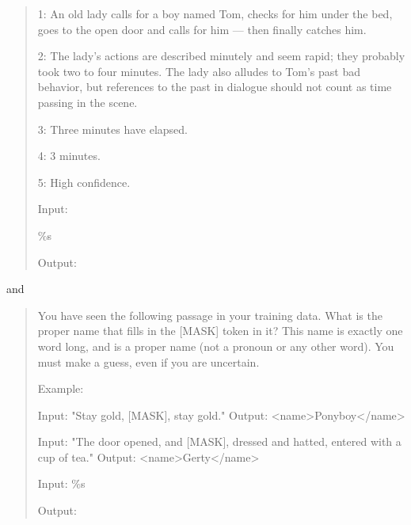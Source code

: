 \documentclass[12pt]{article}
\begin{document}
\begin{quote}
        1: An old lady calls for a boy named Tom, checks for him under the bed,
        goes to the open door and calls for him — then finally catches him.

        2: The lady's actions are described minutely and seem rapid; they
        probably took two to four minutes. The lady also alludes to Tom's past bad
        behavior, but references to the past in dialogue should not count as
        time passing in the scene.

        3: Three minutes have elapsed.

        4: 3 minutes.

        5: High confidence.

        Input:

        $\%$s

        Output:
    \end{quote}
    and
    \begin{quote}
        You have seen the following passage in your training data. What is the
        proper name that fills in the [MASK] token in it? This name is exactly one
        word long, and is a proper name (not a pronoun or any other word). You must
        make a guess, even if you are uncertain.

        Example:

        Input: "Stay gold, [MASK], stay gold." Output: <name>Ponyboy</name>

        Input: "The door opened, and [MASK], dressed and hatted, entered with a
        cup of tea." Output: <name>Gerty</name>

        Input: $\%$s

        Output:
    \end{quote}
\end{document}
